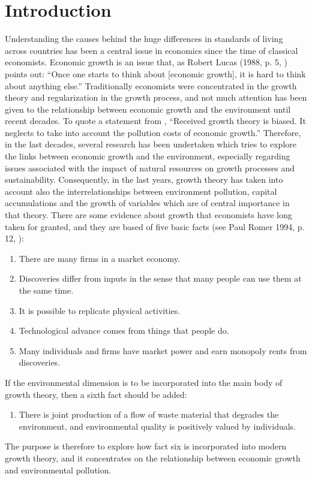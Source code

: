 \section{Introduction}\label{sec:introduction} 
Understanding the causes behind the huge differences in standards of living across countries has been a central issue in economics since the time of classical economists. Economic growth is an issue that, as Robert Lucas (1988, p. 5, \cite{lucas_mechanics_1988}) points out: “Once one starts to think about [economic growth], it is hard to think about anything else.” 
Traditionally economists were concentrated in the growth theory and regularization in the growth process, and not much attention has been given to the relationship between economic growth and the environment until recent decades. To quote a statement from \cite{xepapadeas_chapter_2005}, “Received growth theory is biased. It neglects to take into account
the pollution costs of economic growth.” Therefore, in the last decades, several research has been undertaken which tries to explore the links between economic growth and the environment, especially regarding issues associated with the impact of natural resources on growth processes and sustainability. Consequently, in the last years, growth theory has taken into account also the interrelationships between environment pollution, capital accumulations and the growth of variables which are of central importance in that theory. There are some evidence about growth that economists have long taken for granted, and they are based of five basic facts (see Paul Romer 1994, p. 12, \cite{romer_origins_1994}): 
\begin{enumerate}
    \item There are many firms in a market economy.
    \item Discoveries differ from inputs in the sense that many people can use them at the
    same time.
    \item It is possible to replicate physical activities.
    \item Technological advance comes from things that people do.
    \item Many individuals and firms have market power and earn monopoly rents from discoveries.
\end{enumerate}
If the environmental dimension is to be incorporated into the main body of growth
theory, then a sixth fact should be added:
\begin{enumerate}[resume]
	\item There is joint production of a flow of waste material that degrades the environment, and environmental quality is positively valued by individuals.
\end{enumerate}
The purpose is therefore to explore how fact six is incorporated into
modern growth theory, and it concentrates on the relationship between economic growth and environmental pollution.

